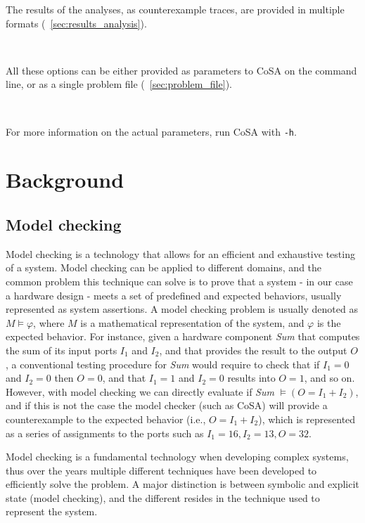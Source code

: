 \documentclass{article}
\theoremstyle{definition}
\begin{document}
\noindent
The results of the analyses, as counterexample traces, are provided in
multiple formats (\textsection~\ref{sec:results_analysis}).

\

\noindent
All these options can be either provided as parameters to CoSA on the
command line, or as a single problem file
(\textsection~\ref{sec:problem_file}).

\

\noindent
For more information on the actual parameters, run CoSA with
\texttt{-h}.


\section{Background}

\subsection{Model checking}
\label{sec:model_checking}
Model checking is a technology that allows for an efficient and
exhaustive testing of a system. Model checking can be applied to
different domains, and the common problem this technique can solve is
to prove that a system - in our case a hardware design - meets a set
of predefined and expected behaviors, usually represented as system
assertions. A model checking problem is usually denoted as $M \models
\varphi$, where $M$ is a mathematical representation of the system,
and $\varphi$ is the expected behavior. For instance, given a hardware
component \emph{Sum} that computes the sum of its input ports $I_1$
and $I_2$, and that provides the result to the output $O$, a
conventional testing procedure for \emph{Sum} would require to check
that if $I_1=0$ and $I_2=0$ then $O=0$, and that $I_1=1$ and $I_2=0$
results into $O=1$, and so on. However, with model checking we can
directly evaluate if \emph{Sum} $ \models (O=I_1+I_2)$, and if this is
not the case the model checker (such as CoSA) will provide a
counterexample to the expected behavior (i.e., $O=I_1+I_2$), which is
represented as a series of assignments to the ports such as $I_1=16,
I_2=13, O=32$.

Model checking is a fundamental technology when developing complex
systems, thus over the years multiple different techniques have been
developed to efficiently solve the problem. A major distinction is
between symbolic and explicit state (model checking), and the
different resides in the technique used to represent the system. 
\end{document}
